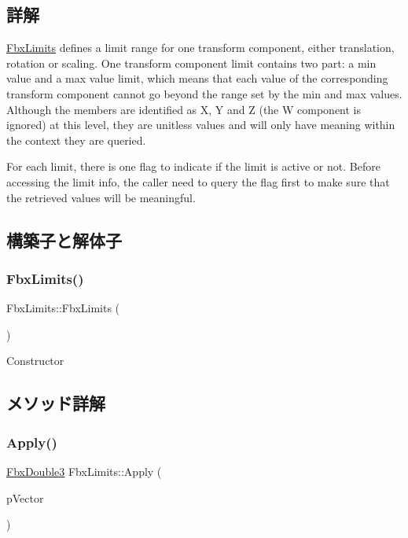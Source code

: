 \subsection{詳解}
\hyperlink{class_fbx_limits}{Fbx\+Limits} defines a limit range for one transform component, either translation, rotation or scaling. One transform component limit contains two part\+: a min value and a max value limit, which means that each value of the corresponding transform component cannot go beyond the range set by the min and max values. Although the members are identified as X, Y and Z (the W component is ignored) at this level, they are unitless values and will only have meaning within the context they are queried.

For each limit, there is one flag to indicate if the limit is active or not. Before accessing the limit info, the caller need to query the flag first to make sure that the retrieved values will be meaningful. 

\subsection{構築子と解体子}
\mbox{\label{class_fbx_limits_a19b22bfab7e355c4d02cea76fa5a0716}} 
\subsubsection{\texorpdfstring{Fbx\+Limits()}{FbxLimits()}}
{\footnotesize\ttfamily Fbx\+Limits\+::\+Fbx\+Limits (\begin{DoxyParamCaption}{ }\end{DoxyParamCaption})}



Constructor 



\subsection{メソッド詳解}
\mbox{\label{class_fbx_limits_a6b64655b62833ad966cf868b4781bf86}} 
\subsubsection{\texorpdfstring{Apply()}{Apply()}}
{\footnotesize\ttfamily \hyperlink{fbxtypes_8h_ae0a96f14cde566774c7553aa7523b7a7}{Fbx\+Double3} Fbx\+Limits\+::\+Apply (\begin{DoxyParamCaption}\item[{const \hyperlink{fbxtypes_8h_ae0a96f14cde566774c7553aa7523b7a7}{Fbx\+Double3} \&}]{p\+Vector }\end{DoxyParamCaption})}


